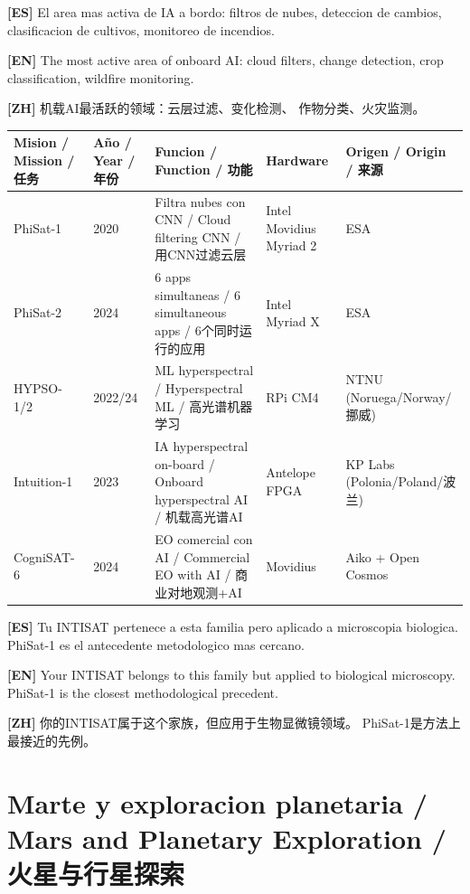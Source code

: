 \documentclass[11pt,a4paper]{report}
\begin{document}
\noindent\textbf{[ES]} El area mas activa de IA a bordo: filtros de
nubes, deteccion de cambios, clasificacion de cultivos, monitoreo de
incendios.

\noindent\textbf{[EN]} The most active area of onboard AI: cloud filters,
change detection, crop classification, wildfire monitoring.

\noindent\textbf{[ZH]} 机载AI最活跃的领域：云层过滤、变化检测、
作物分类、火灾监测。

\begin{center}
\small
\begin{longtable}{p{2.8cm}p{1.2cm}p{3.5cm}p{3cm}p{3cm}}
\toprule
\textbf{Mision / Mission / 任务} &
\textbf{Año / Year / 年份} &
\textbf{Funcion / Function / 功能} &
\textbf{Hardware} &
\textbf{Origen / Origin / 来源} \\
\midrule
\endhead
PhiSat-1 &
2020 &
Filtra nubes con CNN / Cloud filtering CNN / 用CNN过滤云层 &
Intel Movidius Myriad 2 &
ESA \\
PhiSat-2 &
2024 &
6 apps simultaneas / 6 simultaneous apps / 6个同时运行的应用 &
Intel Myriad X &
ESA \\
HYPSO-1/2 &
2022/24 &
ML hyperspectral / Hyperspectral ML / 高光谱机器学习 &
RPi CM4 &
NTNU (Noruega/Norway/挪威) \\
Intuition-1 &
2023 &
IA hyperspectral on-board / Onboard hyperspectral AI / 机载高光谱AI &
Antelope FPGA &
KP Labs (Polonia/Poland/波兰) \\
CogniSAT-6 &
2024 &
EO comercial con AI / Commercial EO with AI / 商业对地观测+AI &
Movidius &
Aiko + Open Cosmos \\
\bottomrule
\end{longtable}
\end{center}

\begin{trilingue}
\textbf{[ES]} Tu INTISAT pertenece a esta familia pero aplicado a
microscopia biologica. PhiSat-1 es el antecedente metodologico mas
cercano.

\textbf{[EN]} Your INTISAT belongs to this family but applied to
biological microscopy. PhiSat-1 is the closest methodological precedent.

\textbf{[ZH]} 你的INTISAT属于这个家族，但应用于生物显微镜领域。
PhiSat-1是方法上最接近的先例。
\end{trilingue}

\chapter{Marte y exploracion planetaria / Mars and Planetary Exploration / 火星与行星探索}
\end{document}
